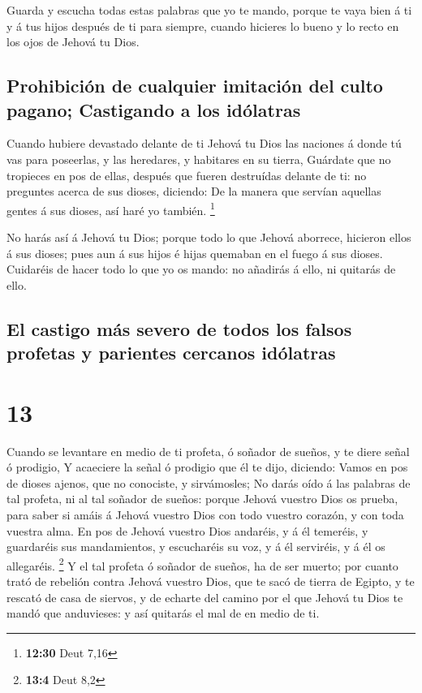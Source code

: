  Guarda y escucha todas estas palabras que yo te mando,
porque te vaya bien á ti y á tus hijos después de ti para siempre,
cuando hicieres lo bueno y lo recto en los ojos de Jehová tu Dios.

\hypertarget{prohibiciuxf3n-de-cualquier-imitaciuxf3n-del-culto-pagano-castigando-a-los-iduxf3latras}{%
\subsection{Prohibición de cualquier imitación del culto pagano;
Castigando a los
idólatras}\label{prohibiciuxf3n-de-cualquier-imitaciuxf3n-del-culto-pagano-castigando-a-los-iduxf3latras}}

 Cuando hubiere devastado delante de ti Jehová tu Dios las
naciones á donde tú vas para poseerlas, y las heredares, y habitares en
su tierra,  Guárdate que no tropieces en pos de ellas,
después que fueren destruídas delante de ti: no preguntes acerca de sus
dioses, diciendo: De la manera que servían aquellas gentes á sus dioses,
así haré yo también. \footnote{\textbf{12:30} Deut 7,16}

 No harás así á Jehová tu Dios; porque todo lo que Jehová
aborrece, hicieron ellos á sus dioses; pues aun á sus hijos é hijas
quemaban en el fuego á sus dioses.  Cuidaréis de hacer todo
lo que yo os mando: no añadirás á ello, ni quitarás de ello.

\hypertarget{el-castigo-muxe1s-severo-de-todos-los-falsos-profetas-y-parientes-cercanos-iduxf3latras}{%
\subsection{El castigo más severo de todos los falsos profetas y
parientes cercanos
idólatras}\label{el-castigo-muxe1s-severo-de-todos-los-falsos-profetas-y-parientes-cercanos-iduxf3latras}}

\hypertarget{section-12}{%
\section{13}\label{section-12}}

 Cuando se levantare en medio de ti profeta, ó soñador de
sueños, y te diere señal ó prodigio,  Y acaeciere la señal ó
prodigio que él te dijo, diciendo: Vamos en pos de dioses ajenos, que no
conociste, y sirvámosles;  No darás oído á las palabras de
tal profeta, ni al tal soñador de sueños: porque Jehová vuestro Dios os
prueba, para saber si amáis á Jehová vuestro Dios con todo vuestro
corazón, y con toda vuestra alma.  En pos de Jehová vuestro
Dios andaréis, y á él temeréis, y guardaréis sus mandamientos, y
escucharéis su voz, y á él serviréis, y á él os allegaréis. \footnote{\textbf{13:4}
  Deut 8,2}  Y el tal profeta ó soñador de sueños, ha de ser
muerto; por cuanto trató de rebelión contra Jehová vuestro Dios, que te
sacó de tierra de Egipto, y te rescató de casa de siervos, y de echarte
del camino por el que Jehová tu Dios te mandó que anduvieses: y así
quitarás el mal de en medio de ti.

